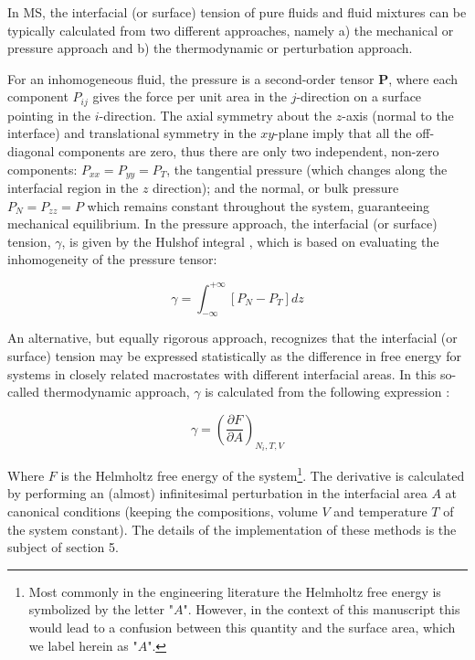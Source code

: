 \documentclass[9pt,bestpractices]{livecoms}
\begin{document}
In MS, the interfacial (or surface) tension of pure fluids and
fluid mixtures can be typically calculated from two different approaches,
namely a) the mechanical or pressure approach and b) the thermodynamic or
perturbation approach.

For an inhomogeneous fluid, the pressure is a second-order tensor \textbf{P},
where each component $P_{ij}$ gives the force per unit area in the
$j$-direction on a surface pointing in the $i$-direction. The
axial symmetry about the $z$-axis (normal to the interface) and
translational symmetry in the $xy$-plane imply that all the off-diagonal
components are zero, thus there are only two independent, non-zero components:
$P_{xx} = P_{yy} = P_T$, the tangential pressure (which changes along the
interfacial region in the $z$ direction); and the normal, or bulk
pressure $P_{N} = P_{zz} = P$ which remains constant
throughout the system, guaranteeing mechanical equilibrium. In the
pressure approach, the interfacial (or surface) tension, $\gamma$, is given by the
Hulshof integral \citep{hulshof1901}, which
is based on evaluating the inhomogeneity of the pressure tensor:

\begin{equation}
\gamma=\int_{-\infty}^{+\infty}\left[P_{N}-P_{T}\right]dz
\label{eq:hulshof}
\end{equation}

An alternative, but equally rigorous approach, recognizes that the interfacial
(or surface) tension may be expressed statistically as the difference in free energy for
systems in closely related macrostates with different interfacial areas. In
this so-called thermodynamic approach, $\gamma$ is calculated from the
following expression \citep{gray2011,gloor2005,errington2007}:

\begin{equation}
\gamma=\left(\frac{\partial F}{\partial A}\right)_{N_{i},T,V}
\label{eq:2}
\end{equation}

Where $F$ is the Helmholtz free energy of the system\footnote{
Most commonly in the engineering literature the Helmholtz free energy is symbolized by the
letter "$A$". However, in the context of this manuscript this would lead
to a confusion between this quantity and the surface area, which we label herein as
"$A$".}.  The derivative is calculated by performing an (almost)
infinitesimal perturbation in the interfacial area $A$ at canonical conditions
(keeping the compositions, volume $V$ and temperature $T$ of the
system constant). The details of the implementation of these methods is the
subject of section 5.
\end{document}
